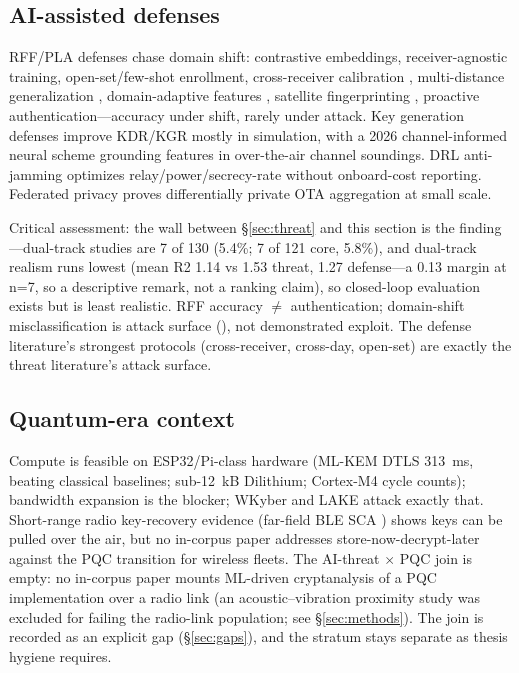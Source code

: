 \documentclass[10.5pt,compsoc,winfonts]{ICN}
\newcommand{\upcite}[1]{\cite{#1}}
\begin{document}
\subsection{AI-assisted defenses}
\label{sec:defense}
RFF/PLA defenses chase domain shift: contrastive embeddings, receiver-agnostic training, open-set/few-shot enrollment, cross-receiver calibration \upcite{D75}, multi-distance generalization \upcite{D73}, domain-adaptive features \upcite{D72}, satellite fingerprinting \upcite{D71}, proactive authentication—accuracy under shift, rarely under attack. Key generation defenses improve KDR/KGR mostly in simulation, with a 2026 channel-informed neural scheme \upcite{D74} grounding features in over-the-air channel soundings. DRL anti-jamming optimizes relay/power/secrecy-rate without onboard-cost reporting. Federated privacy proves differentially private OTA aggregation at small scale.

Critical assessment: the wall between \S\ref{sec:threat} and this section is the finding—dual-track studies are 7 of 130 (5.4\%; 7 of 121 core, 5.8\%), and dual-track realism runs lowest (mean R2 1.14 vs 1.53 threat, 1.27 defense—a 0.13 margin at n=7, so a descriptive remark, not a ranking claim), so closed-loop evaluation exists but is least realistic. RFF accuracy $\ne$ authentication; domain-shift misclassification is attack surface (\upcite{T40}), not demonstrated exploit. The defense literature's strongest protocols (cross-receiver, cross-day, open-set) are exactly the threat literature's attack surface.

\subsection{Quantum-era context}
\label{sec:pqc}
Compute is feasible on ESP32/Pi-class hardware (ML-KEM DTLS 313~ms, beating classical baselines; sub-12~kB Dilithium; Cortex-M4 cycle counts); bandwidth expansion is the blocker; WKyber \upcite{P08} and LAKE \upcite{P11} attack exactly that. Short-range radio key-recovery evidence (far-field BLE SCA \upcite{T01}) shows keys can be pulled over the air, but no in-corpus paper addresses store-now-decrypt-later against the PQC transition for wireless fleets. The AI-threat $\times$ PQC join is empty: no in-corpus paper mounts ML-driven cryptanalysis of a PQC implementation over a radio link (an acoustic–vibration proximity study was excluded for failing the radio-link population; see \S\ref{sec:methods}). The join is recorded as an explicit gap (\S\ref{sec:gaps}), and the stratum stays separate as thesis hygiene requires.
\end{document}
